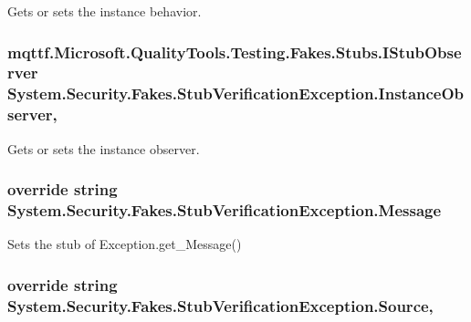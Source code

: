 Gets or sets the instance behavior.

\hypertarget{class_system_1_1_security_1_1_fakes_1_1_stub_verification_exception_a4e31baee88a0b5dfcce05b41bc62f658}{
\subsubsection[{Instance\-Observer}]{\setlength{\rightskip}{0pt plus 5cm}mqttf.\-Microsoft.\-Quality\-Tools.\-Testing.\-Fakes.\-Stubs.\-I\-Stub\-Observer System.\-Security.\-Fakes.\-Stub\-Verification\-Exception.\-Instance\-Observer\hspace{0.3cm}{\ttfamily [get]}, {\ttfamily [set]}}}\label{class_system_1_1_security_1_1_fakes_1_1_stub_verification_exception_a4e31baee88a0b5dfcce05b41bc62f658}


Gets or sets the instance observer.

\hypertarget{class_system_1_1_security_1_1_fakes_1_1_stub_verification_exception_a04a996cfffcbdfc60cefe64a78f518f5}{
\subsubsection[{Message}]{\setlength{\rightskip}{0pt plus 5cm}override string System.\-Security.\-Fakes.\-Stub\-Verification\-Exception.\-Message\hspace{0.3cm}{\ttfamily [get]}}}\label{class_system_1_1_security_1_1_fakes_1_1_stub_verification_exception_a04a996cfffcbdfc60cefe64a78f518f5}


Sets the stub of Exception.\-get\-\_\-\-Message()

\hypertarget{class_system_1_1_security_1_1_fakes_1_1_stub_verification_exception_a7ce5943c9265918e5ab2b65a3f3fbd2f}{
\subsubsection[{Source}]{\setlength{\rightskip}{0pt plus 5cm}override string System.\-Security.\-Fakes.\-Stub\-Verification\-Exception.\-Source\hspace{0.3cm}{\ttfamily [get]}, {\ttfamily [set]}}}\label{class_system_1_1_security_1_1_fakes_1_1_stub_verification_exception_a7ce5943c9265918e5ab2b65a3f3fbd2f}


